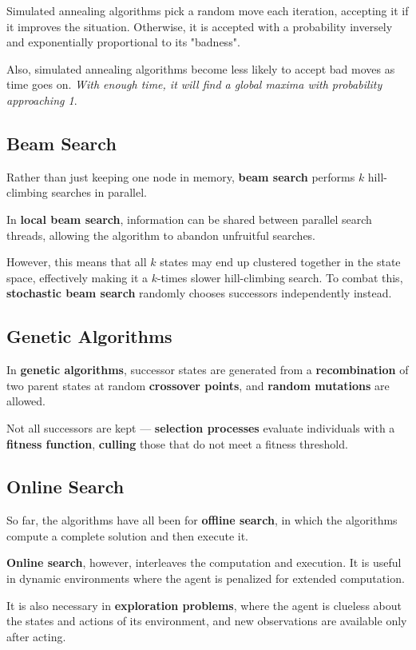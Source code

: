         Simulated annealing algorithms pick a random move each iteration, accepting it if it improves the situation. Otherwise, it is accepted with a probability inversely and exponentially proportional to its "badness".

        Also, simulated annealing algorithms become less likely to accept bad moves as time goes on. \emph{With enough time, it will find a global maxima with probability approaching 1}.

    \subsection{Beam Search}
        Rather than just keeping one node in memory, \textbf{beam search} performs $k$ hill-climbing searches in parallel.

        In \textbf{local beam search}, information can be shared between parallel search threads, allowing the algorithm to abandon unfruitful searches.

        However, this means that all $k$ states may end up clustered together in the state space, effectively making it a $k$-times slower hill-climbing search. To combat this, \textbf{stochastic beam search} randomly chooses successors independently instead.

    \subsection{Genetic Algorithms}
        In \textbf{genetic algorithms}, successor states are generated from a \textbf{recombination} of two parent states at random \textbf{crossover points}, and \textbf{random mutations} are allowed.

        Not all successors are kept --- \textbf{selection processes} evaluate individuals with a \textbf{fitness function}, \textbf{culling} those that do not meet a fitness threshold.

\subsection{Online Search}
    So far, the algorithms have all been for \textbf{offline search}, in which the algorithms compute a complete solution and then execute it.

    \textbf{Online search}, however, interleaves the computation and execution. It is useful in dynamic environments where the agent is penalized for extended computation.

    It is also necessary in \textbf{exploration problems}, where the agent is clueless about the states and actions of its environment, and new observations are available only after acting.
